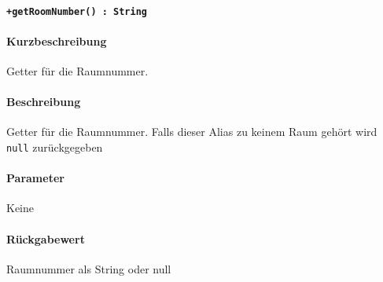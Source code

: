 \paragraph{\texttt{+getRoomNumber() : String}}%
\paragraph*{Kurzbeschreibung}
Getter für die Raumnummer.
\paragraph*{Beschreibung}
Getter für die Raumnummer.
Falls dieser Alias zu keinem Raum gehört wird \verb#null# zurückgegeben
\paragraph*{Parameter}
Keine
\paragraph*{Rückgabewert}
Raumnummer als String oder null